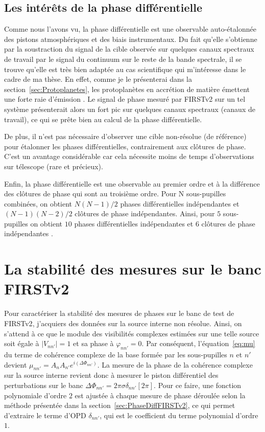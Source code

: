 \subsection{Les intérêts de la phase différentielle}

Comme nous l'avons vu, la phase différentielle est une observable auto-étalonnée des pistons atmosphériques et des biais instrumentaux. Du fait qu'elle s'obtienne par la soustraction du signal de la cible observée sur quelques canaux spectraux de travail par le signal du continuum sur le reste de la bande spectrale, il se trouve qu'elle est très bien adaptée au cas scientifique qui m'intéresse dans le cadre de ma thèse. En effet, comme je le présenterai dans la section~\ref{sec:Protoplanetes}, les protoplanètes en accrétion de matière émettent une forte raie d'émission \ha. Le signal de phase mesuré par \ac{FIRSTv2} sur un tel système présenterait alors un fort pic sur quelques canaux spectraux (canaux de travail), ce qui se prête bien au calcul de la phase différentielle.

De plus, il n'est pas nécessaire d'observer une cible non-résolue (de référence) pour étalonner les phases différentielles, contrairement aux clôtures de phase. C'est un avantage considérable car cela nécessite moins de temps d'observations sur télescope (rare et précieux).

Enfin, la phase différentielle est une observable au premier ordre et à la différence des clôtures de phase qui sont au troisième ordre. Pour N sous-pupilles combinées, on obtient $N(N-1)/2$ phases différentielles indépendantes et $(N-1)(N-2)/2$ clôtures de phase indépendantes. Ainsi, pour $5$ sous-pupilles on obtient $10$ phases différentielles indépendantes et $6$ clôtures de phase indépendantes \citep{millour2006}.


\section{La stabilité des mesures sur le banc FIRSTv2}

Pour caractériser la stabilité des mesures de phases sur le banc de test de \ac{FIRSTv2}, j'acquiers des données sur la source interne non résolue. Ainsi, on s'attend à ce que le module des visibilités complexes estimées sur une telle source soit égale à $|V_{nn'}| = 1$ et sa phase à $\varphi_{nn'} = 0$. Par conséquent, l'équation~\ref{eq:mu} du terme de cohérence complexe de la base formée par les sous-pupilles $n$ et $n'$ devient $\mu_{nn'} = A_n A_{n'} e^{i(\Delta\Phi_{nn'})}$. La mesure de la phase de la cohérence complexe sur la source interne revient donc à mesurer le piston différentiel des perturbations sur le banc $\Delta\Phi_{nn'} = 2 \pi \sigma \delta_{nn'} [2 \pi]$. Pour ce faire, une fonction polynomiale d'ordre $2$ est ajustée à chaque mesure de phase déroulée selon la méthode présentée dans la section~\ref{sec:PhaseDiffFIRSTv2}, ce qui permet d'extraire le terme d'\ac{OPD} $\delta_{nn'}$, qui est le coefficient du terme polynomial d'ordre $1$.

